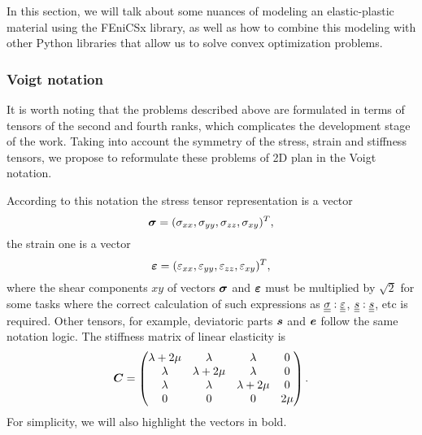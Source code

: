 \documentclass[12pt]{article}
\begin{document}
In this section, we will talk about some nuances of modeling an elastic-plastic material using the FEniCSx library, as well as how to combine this modeling with other Python libraries that allow us to solve convex optimization problems.

\subsubsection{Voigt notation}

It is worth noting that the problems described above are formulated in terms of tensors of the second and fourth ranks, which complicates the development stage of the work. Taking into account the symmetry of the stress, strain and stiffness tensors, we propose to reformulate these problems of 2D plan in the Voigt notation.

According to this notation the stress tensor representation is a vector
\begin{equation*}
    \mbox{\boldmath $\sigma$} = (\sigma_{xx}, \sigma_{yy}, \sigma_{zz}, \sigma_{xy})^T,  
\end{equation*}
the strain one is a vector
\begin{equation*}
    \mbox{\boldmath $\varepsilon$} = (\varepsilon_{xx}, \varepsilon_{yy}, \varepsilon_{zz}, \varepsilon_{xy})^T,
\end{equation*}
where the shear components $xy$ of vectors $\mbox{\boldmath $\sigma$}$ and $\mbox{\boldmath $\varepsilon$}$ must be multiplied by $\sqrt{2}$ for some tasks where the correct calculation of such expressions as $\underline{\underline{\sigma}}:\underline{\underline{\varepsilon}}$, $\underline{\underline{s}}:\underline{\underline{s}}$, etc is required. Other tensors, for example, deviatoric parts $\mbox{\boldmath $s$}$ and $\mbox{\boldmath $e$}$ follow the same notation logic. The stiffness matrix of linear elasticity is 
\begin{equation*}
    \mbox{\boldmath $C$} = 
    \begin{pmatrix}
        \lambda + 2\mu & \lambda & \lambda & 0 \\
        \lambda & \lambda + 2\mu & \lambda & 0 \\
        \lambda & \lambda & \lambda + 2\mu & 0 \\
        0 & 0 & 0 & 2\mu 
    \end{pmatrix}.
\end{equation*}
For simplicity, we will also highlight the vectors in bold.
\end{document}
